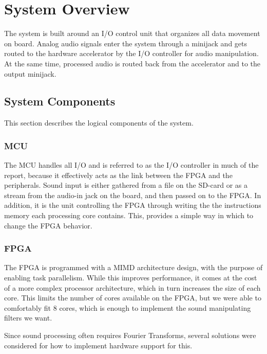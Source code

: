 
\section{System Overview}

The system is built around an I/O control unit that organizes all data movement
on board. Analog audio signals enter the system through a minijack and gets
routed to the hardware accelerator by the I/O controller for audio manipulation.
At the same time, processed audio is routed back from the accelerator and to the
output minijack.

\subsection{System Components}
This section describes the logical components of the system.

\subsubsection{MCU}\label{intro:system-components-mcu}

The MCU handles all I/O and is referred to as the I/O controller in much of the
report, because it effectively acts as the link between the FPGA and the
peripherals. Sound input is either gathered from a file on the SD-card or as a
stream from the audio-in jack on the board, and then passed on to the FPGA. In
addition, it is the unit controlling the FPGA through writing the the
instructions memory each processing core contains. This, provides a simple way
in which to change the FPGA behavior.

\subsubsection{FPGA}

The FPGA is programmed with a MIMD architecture design, with the purpose of
enabling task parallelism. While this improves performance, it comes at the cost
of a more complex processor architecture, which in turn increases the size of
each core. This limits the number of cores available on the FPGA, but we were
able to comfortably fit 8 cores, which is enough to implement the sound
manipulating filters we want.

Since sound processing often requires Fourier Transforms, several solutions were
considered for how to implement hardware support for this.

